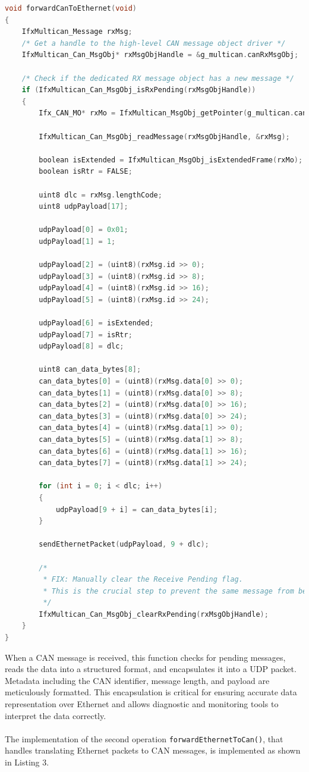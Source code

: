 \begin{lstlisting}[language=C, caption={CAN to Ethernet message translation (Gateway.c)}, label={lst:can_to_eth}]
void forwardCanToEthernet(void)
{
    IfxMultican_Message rxMsg;
    /* Get a handle to the high-level CAN message object driver */
    IfxMultican_Can_MsgObj* rxMsgObjHandle = &g_multican.canRxMsgObj;

    /* Check if the dedicated RX message object has a new message */
    if (IfxMultican_Can_MsgObj_isRxPending(rxMsgObjHandle))
    {
        Ifx_CAN_MO* rxMo = IfxMultican_MsgObj_getPointer(g_multican.can.mcan, rxMsgObjHandle->msgObjId);

        IfxMultican_Can_MsgObj_readMessage(rxMsgObjHandle, &rxMsg);

        boolean isExtended = IfxMultican_MsgObj_isExtendedFrame(rxMo);
        boolean isRtr = FALSE;

        uint8 dlc = rxMsg.lengthCode;
        uint8 udpPayload[17];

        udpPayload[0] = 0x01;
        udpPayload[1] = 1;

        udpPayload[2] = (uint8)(rxMsg.id >> 0);
        udpPayload[3] = (uint8)(rxMsg.id >> 8);
        udpPayload[4] = (uint8)(rxMsg.id >> 16);
        udpPayload[5] = (uint8)(rxMsg.id >> 24);

        udpPayload[6] = isExtended;
        udpPayload[7] = isRtr;
        udpPayload[8] = dlc;

        uint8 can_data_bytes[8];
        can_data_bytes[0] = (uint8)(rxMsg.data[0] >> 0);
        can_data_bytes[1] = (uint8)(rxMsg.data[0] >> 8);
        can_data_bytes[2] = (uint8)(rxMsg.data[0] >> 16);
        can_data_bytes[3] = (uint8)(rxMsg.data[0] >> 24);
        can_data_bytes[4] = (uint8)(rxMsg.data[1] >> 0);
        can_data_bytes[5] = (uint8)(rxMsg.data[1] >> 8);
        can_data_bytes[6] = (uint8)(rxMsg.data[1] >> 16);
        can_data_bytes[7] = (uint8)(rxMsg.data[1] >> 24);

        for (int i = 0; i < dlc; i++)
        {
            udpPayload[9 + i] = can_data_bytes[i];
        }

        sendEthernetPacket(udpPayload, 9 + dlc);

        /*
         * FIX: Manually clear the Receive Pending flag.
         * This is the crucial step to prevent the same message from being read again.
         */
        IfxMultican_Can_MsgObj_clearRxPending(rxMsgObjHandle);
    }
}
\end{lstlisting}
When a CAN message is received, this function checks for pending messages, reads the data into a structured format, and encapsulates it into a UDP packet. Metadata including the CAN identifier, message length, and payload are meticulously formatted. This encapsulation is critical for ensuring accurate data representation over Ethernet and allows diagnostic and monitoring tools to interpret the data correctly.\\\\
The implementation of the second operation \verb|forwardEthernetToCan()|, that handles translating Ethernet packets to CAN messages, is implemented as shown in Listing 3.

